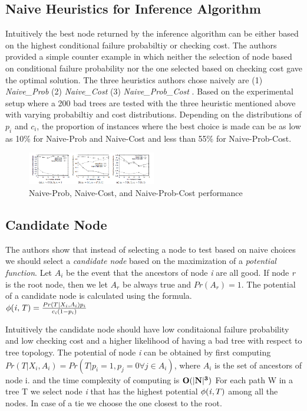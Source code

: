 \documentclass[10pt]{sigplan-proc-varsize}
\begin{document}
\subsection{Naive Heuristics for Inference Algorithm}
Intuitively the best node returned by the inference algorithm can be either based on the highest conditional failure probabiltiy or checking cost.  The authors provided a simple counter example in which neither the selection of node based on conditional failure probability nor the one selected based on checking cost gave the optimal solution. The three heuristics authors chose naively are (1) {\it Naive_Prob} (2) {\it Naive_Cost} (3) {\it Naive_Prob_Cost} . Based on the experimental setup where a 200 bad trees are tested with the three heuristic mentioned above with varying probabiltiy and cost distributions. Depending on the distributions of $p_i$ and $c_i$, the proportion of instances where the best choice is made can be as low as 10\% for Naive-Prob and Naive-Cost  and less than 55\% for Naive-Prob-Cost.
\begin{figure}[h!]
  \caption{Naive-Prob, Naive-Cost, and Naive-Prob-Cost performance}
  \centering
    \includegraphics[width=0.5\textwidth]{Fig11}
\end{figure}

\subsection{Candidate Node}
The authors show that instead of selecting a node to test based on naive choices we should select a {\it candidate node} based on the maximization of a {\it potential function}. Let $A_i$ be the event that the ancestors of node {\it i} are all good. If node {\it r} is the root node, then we let $A_r$ be always true and $Pr(A_r) = 1$. The potential of a candidate node is calculated using the formula. \\
                     $\phi({\it i,T)} = \frac{Pr(T|X_i,A_i)p_i}{c_i(1-p_i)}$

Intuitively the candidate node should have low conditaional failure probability and low checking cost and a higher likelihood of having a bad tree with respect to tree topology. The potential of node {\it i} can be obtained by first computing $Pr(T |X_i , A_i ) = Pr(T | p_i = 1, p_j = 0 \forall j \in A_i )$, where $A_i$ is the set of ancestors of node i. and the time complexity of computing is ${\bf O(|N|^3)}$ For each path W in a tree T we select node {\it i} that has the highest potential $\phi({\it i},T)$ among all the nodes. In case of a tie we choose the one closest to the root.
\end{document}
